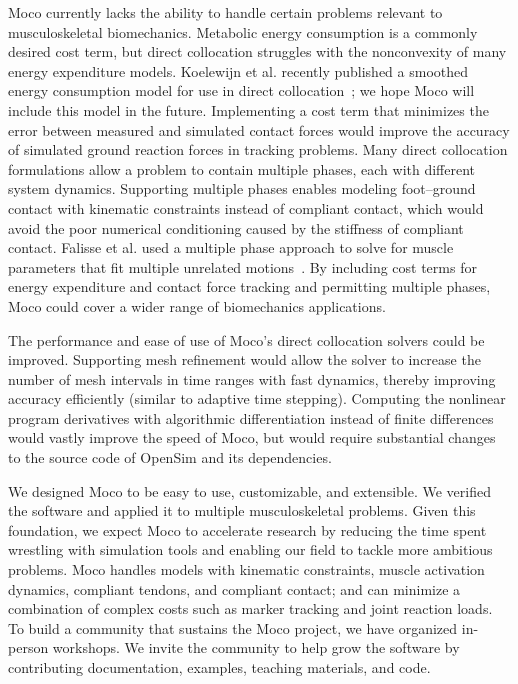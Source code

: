 \documentclass[10pt,letterpaper]{article}
\begin{document}
Moco currently lacks the ability to handle certain problems relevant to musculoskeletal biomechanics. Metabolic energy consumption is a commonly desired cost term, but direct collocation struggles with the nonconvexity of many energy expenditure models. Koelewijn et al. recently published a smoothed energy consumption model for use in direct collocation~\cite{Koelewijn:2019}; we hope Moco will include this model in the future. Implementing a cost term that minimizes the error between measured and simulated contact forces would improve the accuracy of simulated ground reaction forces in tracking problems. Many direct collocation formulations allow a problem to contain multiple phases, each with different system dynamics. Supporting multiple phases enables modeling foot–ground contact with kinematic constraints instead of compliant contact, which would avoid the poor numerical conditioning caused by the stiffness of compliant contact. Falisse et al. used a multiple phase approach to solve for muscle parameters that fit multiple unrelated motions~\cite{Falisse:2016}. By including cost terms for energy expenditure and contact force tracking and permitting multiple phases, Moco could cover a wider range of biomechanics applications.

The performance and ease of use of Moco’s direct collocation solvers could be improved. Supporting mesh refinement would allow the solver to increase the number of mesh intervals in time ranges with fast dynamics, thereby improving accuracy efficiently (similar to adaptive time stepping). Computing the nonlinear program derivatives with algorithmic differentiation instead of finite differences would vastly improve the speed of Moco, but would require substantial changes to the source code of OpenSim and its dependencies.

We designed Moco to be easy to use, customizable, and extensible. We verified the software and applied it to multiple musculoskeletal problems. Given this foundation, we expect Moco to accelerate research by reducing the time spent wrestling with simulation tools and enabling our field to tackle more ambitious problems. Moco handles models with kinematic constraints, muscle activation dynamics, compliant tendons, and compliant contact; and can minimize a combination of complex costs such as marker tracking and joint reaction loads. To build a community that sustains the Moco project, we have organized in-person workshops. We invite the community to help grow the software by contributing documentation, examples, teaching materials, and code.
\end{document}
